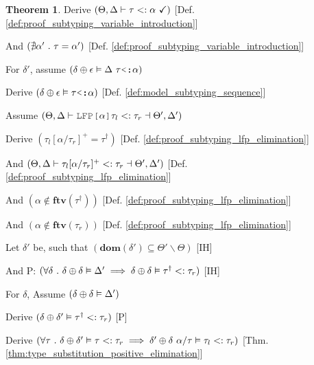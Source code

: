 \documentclass[acmsmall]{acmart}
\theoremstyle{definition}
\newtheorem{theorem}{Theorem}[section]
\begin{document}
\begin{theorem}
  \item \I \N Derive $(
    \Theta, \Delta \vdash \tau <: \alpha \ \checkmark
  )$ [Def. \ref{def:proof_subtyping_variable_introduction}]

  \item \I \N And $(
    \nexists \alpha' \ .\  \tau = \alpha'
  )$ [Def. \ref{def:proof_subtyping_variable_introduction}]

  \item \I \N For $\delta'$, assume $(
    \delta \oplus \epsilon \satisfies \Delta\ \tau \J{<:} \alpha
  )$ 
  \item \I\I \N Derive $(
    \delta \oplus \epsilon \satisfies \tau \J{<:} \alpha
  )$ [Def. \ref{def:model_subtyping_sequence}]


  \item \N Assume $(
    \Theta, \Delta \entails 
    \J{LFP[}\alpha\J{]}\tau_l \subtypes \tau_r 
    \given \Theta', \Delta' 
  )$
  \item \I \N Derive $(
    \tau_l[\alpha\slash\tau_r]^+ = \tau^\dagger 
  )$ [Def. \ref{def:proof_subtyping_lfp_elimination}]
  \item \I \N And $(
    \Theta, \Delta \vdash 
    \tau_l[\alpha\slash\tau_r]^+ <: \tau_r \dashv 
    \Theta', \Delta'
  )$ [Def. \ref{def:proof_subtyping_lfp_elimination}]
  \item \I \N And $(
    \alpha \not\in \textbf{ftv}(\tau^\dagger)
  )$ [Def. \ref{def:proof_subtyping_lfp_elimination}]
  \item \I \N And $(
    \alpha \not\in \textbf{ftv}(\tau_r)
  )$ [Def. \ref{def:proof_subtyping_lfp_elimination}]

  \item \I \N Let $\delta'$ be, such that $(
    \textbf{dom}(\delta') \subseteq \Theta' \backslash \Theta
  )$ [IH]

  \item \I \N And P: $(
    \forall \delta \ .\ 
    \delta \oplus \delta \vDash \Delta'
    \implies
    \delta \oplus \delta \vDash \tau^\dagger <: \tau_r
  )$ [IH]


  \item \I \N For $\delta$, Assume $(
    \delta \oplus \delta \vDash \Delta'
  )$

  \item \I\I \N Derive $(
    \delta \oplus \delta' \vDash \tau^\dagger <: \tau_r
  )$ [P]

  \item \I\I \N Derive $(
    \forall \tau \ .\  \delta \oplus \delta' \vDash \tau <: \tau_r \implies \delta' \oplus \delta\ \alpha \slash \tau \vDash \tau_l <: \tau_r
  )$ [Thm. \ref{thm:type_substitution_positive_elimination}]


\end{theorem}
\end{document}
